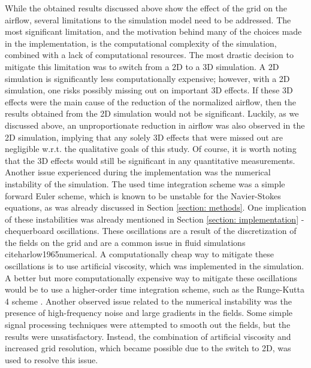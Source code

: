 While the obtained results discussed above show the effect of the grid on the airflow, several limitations to the simulation model need to be addressed. The most significant limitation, and the motivation behind many of the choices made in the implementation, is the computational complexity of the simulation, combined with a lack of computational resources. The most drastic decision to mitigate this limitation was to switch from a 2D to a 3D simulation. A 2D simulation is significantly less computationally expensive; however, with a 2D simulation, one risks possibly missing out on important 3D effects. If these 3D effects were the main cause of the reduction of the normalized airflow, then the results obtained from the 2D simulation would not be significant. Luckily, as we discussed above, an unproportionate reduction in airflow was also observed in the 2D simulation, implying that any solely 3D effects that were missed out are negligible w.r.t. the qualitative goals of this study. Of course, it is worth noting that the 3D effects would still be significant in any quantitative measurements.  \\

Another issue experienced during the implementation was the numerical instability of the simulation. The used time integration scheme was a simple forward Euler scheme, which is known to be unstable for the Navier-Stokes equations, as was already discussed in Section \ref{section: methods}. One implication of these instabilities was already mentioned in Section \ref{section: implementation} - chequerboard oscillations. These oscillations are a result of the discretization of the fields on the grid and are a common issue in fluid simulations cite{harlow1965numerical}. A computationally cheap way to mitigate these oscillations is to use artificial viscosity, which was implemented in the simulation. A better but more computationally expensive way to mitigate these oscillations would be to use a higher-order time integration scheme, such as the Runge-Kutta 4 scheme \cite{RungeKutta}. Another observed issue related to the numerical instability was the presence of high-frequency noise and large gradients in the fields. Some simple signal processing techniques were attempted to smooth out the fields, but the results were unsatisfactory. Instead, the combination of artificial viscosity and increased grid resolution, which became possible due to the switch to 2D, was used to resolve this issue. \\

